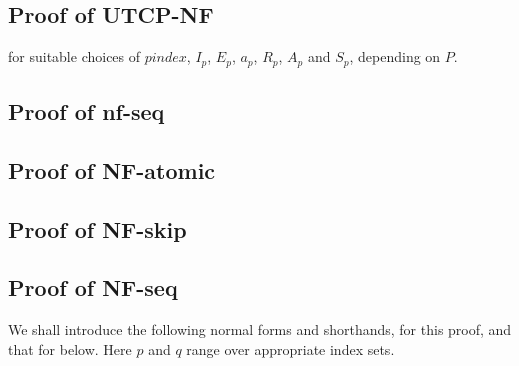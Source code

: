 \subsection{Proof of UTCP-NF}

for suitable choices of $pindex$, $I_p$, $E_p$, $a_p$, $R_p$, $A_p$ and $S_p$,
depending on $P$.

\subsection{Proof of nf-seq}




\subsection{Proof of NF-atomic}



\subsection{Proof of NF-skip}


\subsection{Proof of NF-seq}

We shall introduce the following normal forms and shorthands,
for this proof, and that for  below.
Here $p$ and $q$ range over appropriate index sets.

